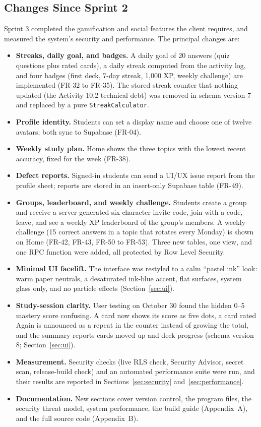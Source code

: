 \documentclass[12pt,letterpaper]{article}
\begin{document}
\subsection{Changes Since Sprint 2}
Sprint 3 completed the gamification and social features the client requires, and
measured the system's security and performance. The principal changes are:
\begin{itemize}
  \item \textbf{Streaks, daily goal, and badges.} A daily goal of 20 answers (quiz
        questions plus rated cards), a daily streak computed from the activity log,
        and four badges (first deck, 7-day streak, 1,000 XP, weekly challenge) are
        implemented (FR-32 to FR-35). The stored streak counter that nothing updated
        (the Activity 10.2 technical debt) was removed in schema version 7 and replaced
        by a pure \texttt{StreakCalculator}.
  \item \textbf{Profile identity.} Students can set a display name and choose one of
        twelve avatars; both sync to Supabase (FR-04).
  \item \textbf{Weekly study plan.} Home shows the three topics with the lowest recent
        accuracy, fixed for the week (FR-38).
  \item \textbf{Defect reports.} Signed-in students can send a UI/UX issue report from
        the profile sheet; reports are stored in an insert-only Supabase table (FR-49).
  \item \textbf{Groups, leaderboard, and weekly challenge.} Students create a group and
        receive a server-generated six-character invite code, join with a code, leave,
        and see a weekly XP leaderboard of the group's members. A weekly challenge
        (15 correct answers in a topic that rotates every Monday) is shown on Home
        (FR-42, FR-43, FR-50 to FR-53). Three new tables, one view, and one RPC
        function were added, all protected by Row Level Security.
  \item \textbf{Minimal UI facelift.} The interface was restyled to a calm ``pastel
        ink'' look: warm paper neutrals, a desaturated ink-blue accent, flat surfaces,
        system glass only, and no particle effects (Section~\ref{sec:ui}).
  \item \textbf{Study-session clarity.} User testing on October 30 found the
        hidden 0--5 mastery score confusing. A card now shows its score as
        five dots, a card rated Again is announced as a repeat in the counter
        instead of growing the total, and the summary reports cards moved up
        and deck progress (schema version 8; Section~\ref{sec:ui}).
  \item \textbf{Measurement.} Security checks (live RLS check, Security Advisor,
        secret scan, release-build check) and an automated performance suite were run,
        and their results are reported in Sections~\ref{sec:security}
        and~\ref{sec:performance}.
  \item \textbf{Documentation.} New sections cover version control, the program
        files, the security threat model, system performance, the build guide
        (Appendix~A), and the full source code (Appendix~B).
\end{itemize}
\end{document}
